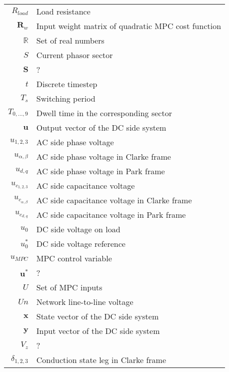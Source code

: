 \begin{longtable}{r l}
  $R_{load}$                        & Load resistance\\
  $\boldsymbol{R}_w$                & Input weight matrix of quadratic MPC cost function\\
  $\mathbb{R}$                      & Set of real numbers\\
  $S$                               & Current phasor sector\\
  $\boldsymbol{S}$                  & ?\\
  $t$                               & Discrete timestep\\
  $T_s$                             & Switching period\\
  $T_{0,\dots,9}$                   & Dwell time in the corresponding sector\\
  $\boldsymbol{u}$                  & Output vector of the DC side system\\
  $u_{1,2,3}$                       & AC side phase voltage\\
  $u_{\alpha,\beta}$                & AC side phase voltage in Clarke frame\\
  $u_{d,q}$                         & AC side phase voltage in Park frame\\
  $u_{c_{1,2,3}}$                   & AC side capacitance voltage\\
  $u_{c_{\alpha,\beta}}$            & AC side capacitance voltage in Clarke frame\\
  $u_{c_{d,q}}$                     & AC side capacitance voltage in Park frame\\
  $u_0$                             & DC side voltage on load\\
  $u^*_0$                           & DC side voltage reference\\
  $u_{MPC}$                         & MPC control variable\\
  $\boldsymbol{u}^*$                & ?\\
  $U$                               & Set of MPC inputs\\
  $Un$                              & Network line-to-line voltage\\
  $\boldsymbol{x}$                  & State vector of the DC side system\\
  $\boldsymbol{y}$                  & Input vector of the DC side system\\
  $V_z$                             & ?\\
  $\delta_{1,2,3}$                  & Conduction state leg in Clarke frame\\

\end{longtable}
